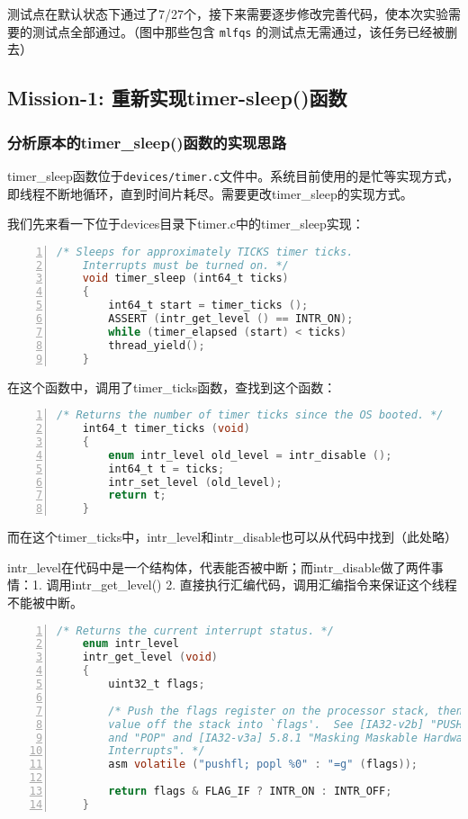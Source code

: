 \documentclass{article}
\begin{document}
    测试点在默认状态下通过了7/27个，接下来需要逐步修改完善代码，使本次实验需要的测试点全部通过。（图中那些包含 \texttt{mlfqs} 的测试点无需通过，该任务已经被删去）
	
	\subsection{Mission-1: 重新实现timer-sleep()函数}
	\subsubsection{分析原本的timer\_sleep()函数的实现思路}
	
	timer\_sleep函数位于\texttt{devices/timer.c}文件中。系统目前使用的是忙等实现方式，即线程不断地循环，直到时间片耗尽。需要更改timer\_sleep的实现方式。
	
	我们先来看一下位于devices目录下timer.c中的timer\_sleep实现：
	
	\begin{lstlisting}[xleftmargin = 4em,xrightmargin = 4em, aboveskip = 1em, numbers = left, language = C,title=原本的\texttt{timer\_sleep()}函数]
    /* Sleeps for approximately TICKS timer ticks.  
    Interrupts must be turned on. */
    void timer_sleep (int64_t ticks)
    {
    	int64_t start = timer_ticks ();
    	ASSERT (intr_get_level () == INTR_ON);
    	while (timer_elapsed (start) < ticks)
    	thread_yield();
    }
	\end{lstlisting}
	
	在这个函数中，调用了timer\_ticks函数，查找到这个函数：
	
	\begin{lstlisting}[xleftmargin = 4em,xrightmargin = 4em, aboveskip = 1em, numbers = left, language = C,title=\texttt{timer\_ticks()}函数]
    /* Returns the number of timer ticks since the OS booted. */
    int64_t timer_ticks (void)
    {
    	enum intr_level old_level = intr_disable ();
    	int64_t t = ticks;
    	intr_set_level (old_level);
    	return t;
    }
	\end{lstlisting}
	
	而在这个timer\_ticks中，intr\_level和intr\_disable也可以从代码中找到（此处略）
	
	intr\_level在代码中是一个结构体，代表能否被中断；而intr\_disable做了两件事情：1. 调用intr\_get\_level() 2. 直接执行汇编代码，调用汇编指令来保证这个线程不能被中断。
	
	\begin{lstlisting}[xleftmargin = 4em,xrightmargin = 4em, aboveskip = 1em, numbers = left, language = C,title=\texttt{get\_level()}函数]
    /* Returns the current interrupt status. */
    enum intr_level
    intr_get_level (void)
    {
    	uint32_t flags;
    	
    	/* Push the flags register on the processor stack, then pop the
    	value off the stack into `flags'.  See [IA32-v2b] "PUSHF"
    	and "POP" and [IA32-v3a] 5.8.1 "Masking Maskable Hardware
    	Interrupts". */
    	asm volatile ("pushfl; popl %0" : "=g" (flags));
    	
    	return flags & FLAG_IF ? INTR_ON : INTR_OFF;
    }
	\end{lstlisting}
	
\end{document}
